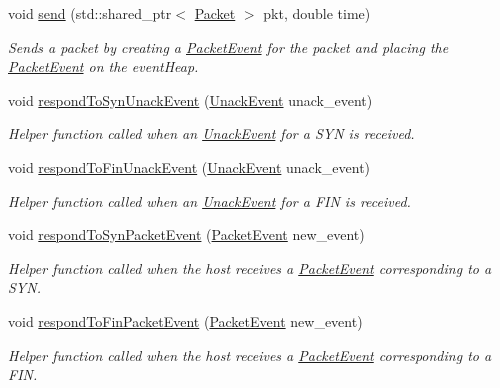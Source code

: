 \begin{DoxyCompactItemize}
void \hyperlink{classHost_a7aeac15cbcd5d64ff8c2af090d8db0c4}{send} (std\-::shared\-\_\-ptr$<$ \hyperlink{classPacket}{\-Packet} $>$ pkt, double time)
\begin{DoxyCompactList}\small\item\em \-Sends a packet by creating a \hyperlink{classPacketEvent}{\-Packet\-Event} for the packet and placing the \hyperlink{classPacketEvent}{\-Packet\-Event} on the event\-Heap. \end{DoxyCompactList}\item 
void \hyperlink{classHost_a13a11214f204347c85388b28043459c2}{respond\-To\-Syn\-Unack\-Event} (\hyperlink{classUnackEvent}{\-Unack\-Event} unack\-\_\-event)
\begin{DoxyCompactList}\small\item\em \-Helper function called when an \hyperlink{classUnackEvent}{\-Unack\-Event} for a \-S\-Y\-N is received. \end{DoxyCompactList}\item 
void \hyperlink{classHost_a9f76466a0f9e8362f70c7990eae22641}{respond\-To\-Fin\-Unack\-Event} (\hyperlink{classUnackEvent}{\-Unack\-Event} unack\-\_\-event)
\begin{DoxyCompactList}\small\item\em \-Helper function called when an \hyperlink{classUnackEvent}{\-Unack\-Event} for a \-F\-I\-N is received. \end{DoxyCompactList}\item 
void \hyperlink{classHost_a55abc101a34bd2bc1aff724883a85ecc}{respond\-To\-Syn\-Packet\-Event} (\hyperlink{classPacketEvent}{\-Packet\-Event} new\-\_\-event)
\begin{DoxyCompactList}\small\item\em \-Helper function called when the host receives a \hyperlink{classPacketEvent}{\-Packet\-Event} corresponding to a \-S\-Y\-N. \end{DoxyCompactList}\item 
void \hyperlink{classHost_a6f3523a2e00b6aae6f5e9fa14b0f0e0f}{respond\-To\-Fin\-Packet\-Event} (\hyperlink{classPacketEvent}{\-Packet\-Event} new\-\_\-event)
\begin{DoxyCompactList}\small\item\em \-Helper function called when the host receives a \hyperlink{classPacketEvent}{\-Packet\-Event} corresponding to a \-F\-I\-N. \end{DoxyCompactList}\end{DoxyCompactItemize}
